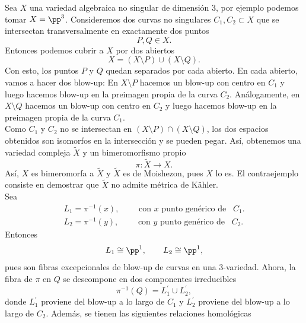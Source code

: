 \begin{example}\label{hironakaejemplo}\parencite{barlet2015exampleshhironaka}
	Sea $X$ una variedad algebraica no singular de dimensión $3$, por ejemplo podemos tomar $X=\pp^3$. Consideremos dos curvas no singulares $C_1, C_2\subset X$ que se intersectan transversalmente en exactamente dos puntos
	\begin{equation*}
		P,Q\in X.
	\end{equation*} 
	Entonces podemos cubrir a $X$ por dos abiertos
	\begin{equation*}
		X=(X\setminus P)\cup(X\setminus Q).
	\end{equation*}
	Con esto, los puntos $P$ y $Q$ quedan separados por cada abierto. En cada abierto, vamos a hacer dos blow-up: En $X\setminus P$ hacemos un blow-up con centro en $C_1$ y luego hacemos blow-up en la preimagen propia de la curva $C_2$. Análogamente, en $X\setminus Q$ hacemos un blow-up con centro en $C_2$ y luego hacemos blow-up en la preimagen propia de la curva $C_1$.\\
	Como $C_1$ y $C_2$ no se intersectan en $(X\setminus P)\cap(X\setminus Q)$, los dos espacios obtenidos son isomorfos en la intersección y se pueden pegar. Así, obtenemos una variedad compleja $\tilde{X}$ y un bimeromorfismo propio
	\begin{equation*}
		\pi:\tilde{X}\longrightarrow X.
	\end{equation*} 
	Así, $X$ es bimeromorfa a $\tilde{X}$ y $\tilde{X}$ es de Moishezon, pues $X$ lo es. El contraejemplo consiste en demostrar que $\tilde{X}$ no admite métrica de Kähler.\\
	Sea 
	\begin{align*}
		L_1=\pi^{-1}(x),\qquad \text{ con }x\text{ punto genérico de }\enspace C_1.\\
		L_2=\pi^{-1}(y),\qquad \text{ con }y\text{ punto genérico de }\enspace C_2.
	\end{align*}
	Entonces
	\begin{equation*}
		L_1\cong \pp^1,\qquad L_2\cong\pp^1,
	\end{equation*}
	pues son fibras excepcionales de blow-up de curvas en una $3$-variedad. Ahora, la fibra de $\pi$ en $Q$ se descompone en dos componentes irreducibles
	\begin{equation*}
		\pi^{-1}(Q)=L_1^\prime\cup L_2^\prime,
	\end{equation*}
	donde $L_1^\prime$ proviene del blow-up a lo largo de $C_1$ y $L_2^\prime$ proviene del blow-up a lo largo de $C_2$. Además, se tienen las siguientes relaciones homológicas

\end{example}
